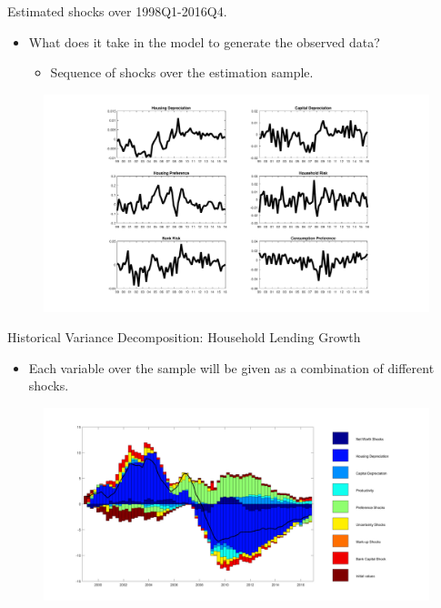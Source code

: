 \documentclass[8pt,aspectratio=169]{beamer}
\numberwithin{equation}{section}
\begin{document}
\begin{frame}{Estimated shocks over 1998Q1-2016Q4.}
\begin{itemize}
\item What does it take in the model to generate the observed data? 

\begin{itemize}
\item Sequence of shocks over the estimation sample. 
\end{itemize}

\end{itemize}
\begin{figure}[H]
\includegraphics[scale=0.3]{smoothed_shocks.pdf}
\end{figure}

\end{frame}






\begin{frame}{Historical Variance Decomposition: Household Lending Growth }
\begin{itemize}

\item Each variable over the sample will be given as a combination of different shocks.
\end{itemize}

\begin{figure}
\includegraphics[scale=0.36]{decomp_dbm.pdf}
\end{figure}
\end{frame}
\end{document}
